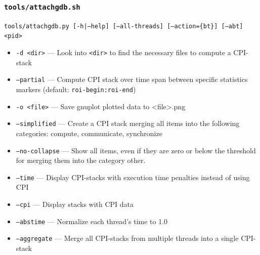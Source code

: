 \documentclass[a4paper,11pt,titlepage]{article}
\newcommand{\cmd}[1]{{\tt #1}}
\newcommand{\opt}[1]{{\tt #1}}
\begin{document}
\subsubsection{\cmd{tools/attachgdb.sh}}

\cmd{tools/attachgdb.py [-h|--help] [--all-threads] [--action=\{bt\}] [--abt] <pid>}

\begin{itemize}[label=$$]
\item \opt{--all-threads} --- Perform the action on all threads
\item \opt{--action=} --- Perform an action (default = bt, backtrace) on all threads
\item \opt{--abt} --- Shorthand for \cmd{attachgdb.py --all-threads --action=bt}
\end{itemize}

\subsubsection{\cmd{tools/cpistack.py}}

\cmd{tools/cpistack.py [-h (help)] [-d <resultsdir (default: .)>] [--partial <sec-begin>:<sec-end>] [-o <output-filename (cpi-stack)>] [--without-roi] [--simplified] [--no-collapse] [--no-simple-mem] [--time|--cpi|--abstime (default: time)] [--aggregate]}

\begin{itemize}[label=$$]
\item \opt{-d <dir>} --- Look into \opt{<dir>} to find the necessary files to compute a CPI-stack
\item \opt{--partial} --- Compute CPI stack over time span between specific statistics markers (default: \opt{roi-begin:roi-end})
\item \opt{-o <file>} --- Save gnuplot plotted data to <file>.png
\item \opt{--simplified} --- Create a CPI stack merging all items into the following categories: compute, communicate, synchronize
\item \opt{--no-collapse} --- Show all items, even if they are zero or below the threshold for merging them into the category other.
\item \opt{--time} --- Display CPI-stacks with execution time penalties instead of using CPI
\item \opt{--cpi} --- Display stacks with CPI data
\item \opt{--abstime} --- Normalize each thread's time to 1.0
\item \opt{--aggregate} --- Merge all CPI-stacks from multiple threads into a single CPI-stack
\end{itemize}
\end{document}
